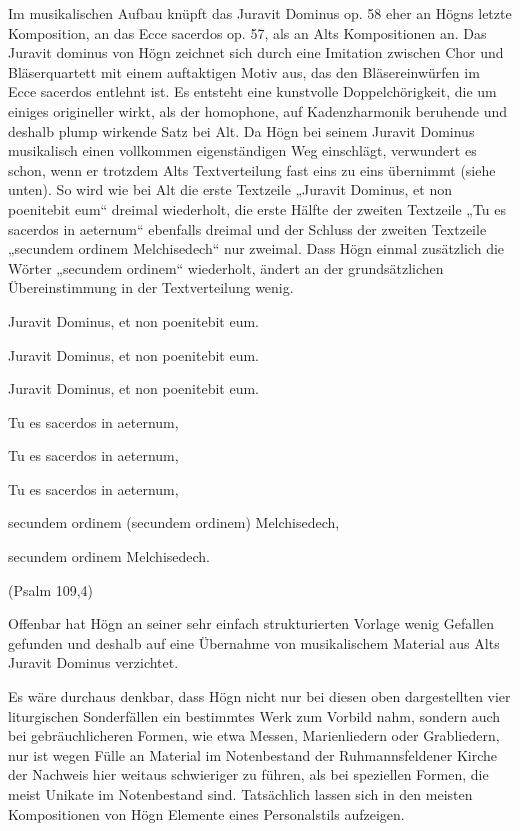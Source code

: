 \documentclass[a4paper]{article}
\begin{document}
Im musikalischen Aufbau knüpft das Juravit Dominus op. 58 eher an Högns
letzte Komposition, an das Ecce sacerdos op. 57, als an Alts
Kompositionen an. Das Juravit dominus von Högn zeichnet sich durch eine
Imitation zwischen Chor und Bläserquartett mit einem auftaktigen Motiv
aus, das den Bläsereinwürfen im Ecce sacerdos entlehnt ist. Es entsteht
eine kunstvolle Doppelchörigkeit, die um einiges origineller wirkt, als
der homophone, auf Kadenzharmonik beruhende und deshalb plump wirkende
Satz bei Alt. Da Högn bei seinem Juravit Dominus musikalisch einen
vollkommen eigenständigen Weg einschlägt, verwundert es schon, wenn er
trotzdem Alts Textverteilung fast eins zu eins übernimmt (siehe unten).
So wird wie bei Alt die erste Textzeile „Juravit Dominus, et non
poenitebit eum“ dreimal wiederholt, die erste Hälfte der zweiten
Textzeile „Tu es sacerdos in aeternum“ ebenfalls dreimal und der
Schluss der zweiten Textzeile „secundem ordinem Melchisedech“ nur
zweimal. Dass Högn einmal zusätzlich die Wörter „secundem ordinem“
wiederholt, ändert an der grundsätzlichen Übereinstimmung in der
Textverteilung wenig.

Juravit Dominus, et non poenitebit eum.

Juravit Dominus, et non poenitebit eum.

Juravit Dominus, et non poenitebit eum.

Tu es sacerdos in aeternum,

Tu es sacerdos in aeternum,

Tu es sacerdos in aeternum,

secundem ordinem (secundem ordinem) Melchisedech,

secundem ordinem Melchisedech.

(Psalm 109,4)

Offenbar hat Högn an seiner sehr einfach strukturierten Vorlage wenig
Gefallen gefunden und deshalb auf eine Übernahme von musikalischem
Material aus Alts Juravit Dominus verzichtet.

Es wäre durchaus denkbar, dass Högn nicht nur bei diesen oben
dargestellten vier liturgischen Sonderfällen ein bestimmtes Werk zum
Vorbild nahm, sondern auch bei gebräuchlicheren Formen, wie etwa
Messen, Marienliedern oder Grabliedern, nur ist wegen Fülle an Material
im Notenbestand der Ruhmannsfeldener Kirche der Nachweis hier weitaus
schwieriger zu führen, als bei speziellen Formen, die meist Unikate im
Notenbestand sind. Tatsächlich lassen sich in den meisten Kompositionen
von Högn Elemente eines Personalstils aufzeigen.
\end{document}
